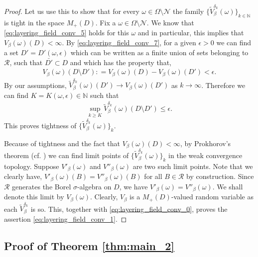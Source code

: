 \documentclass[a4paper, 11pt, reqno]{amsart}
\theoremstyle{definition} \newtheorem{defn}{Definition}[section]
\theoremstyle{remark} \newtheorem{rem}[defn]{Remark}
\theoremstyle{remark} \newtheorem*{rem*}{Remark}
\theoremstyle{plain} \newtheorem{thm}[defn]{Theorem}
\theoremstyle{plain} \newtheorem{lem}[defn]{Lemma}
\theoremstyle{plain} \newtheorem{prop}[defn]{Proposition}
\theoremstyle{plain} \newtheorem{cor}[defn]{Corollary}
\theoremstyle{remark} \newtheorem{exm}[defn]{\textbf{Example}}
\theoremstyle{remark} \newtheorem{exms}[defn]{\textbf{Examples}}
\theoremstyle{remark} \newtheorem*{bl}{}
\numberwithin{equation}{section} %
\newcommand{\mc}{\mathcal}
\newcommand{\N}{\mathbb{N}}
\begin{document}
\begin{proof}
		Let us use this to show that for every $\omega \in \Omega\setminus \mc{N}$ the family $\{\tilde{V}^{\delta_k}_{\beta}(\omega)\}_{k \in \N}$ is tight in the space $M_{+}(D)$. Fix a $\omega \in \Omega\setminus \mc{N}$. We know that \eqref{eq:layering_field_conv_5} holds for this $\omega$ and in particular, this implies that $V_{\beta}(\omega)(D)  < \infty$. By \eqref{eq:layering_field_conv_7}, for a given $\epsilon>0$ we can find a set $D' = D'(\omega, \epsilon)$ which can be written as a finite union of sets belonging to $\mc{R}$, such that $\bar{D'} \subset D$ and which has the property that,
		\begin{align}
			V_{\beta}(\omega) (D \setminus D') : = V_{\beta}(\omega)(D) - V_{\beta}(\omega)(D')< \epsilon.
		\end{align}
		By our assumptions, $\tilde{V}^{\delta_k}_{\beta}(\omega)(D') \to V_{\beta}(\omega)(D')$ as $k \to \infty$. Therefore we can find $K = K (\omega, \epsilon) \in \N$ such that 
		\begin{align}
			\sup_{k \ge K} \tilde{V}^{\delta_k}_{\beta}(\omega) (D\setminus D')  \le \epsilon.
		\end{align}
		This proves tightness of $\{\tilde{V}^{\delta_k}_{\beta}(\omega)\}_{k}$.
		
		Because of tightness and the fact that $V_{\beta}(\omega)(D) < \infty$, by Prokhorov's theorem (cf. \cite[Theorem 8.6.2]{bogachev07}) we can find limit points of $\{ \tilde{V}^{\delta_k}_{\beta}(\omega)\}_k$ in the weak convergence topology. Suppose $V'_{\beta}(\omega)$ and $V''_{\beta}(\omega)$ are two such limit points. Note that we clearly have, $V'_{\beta}(\omega)(B) = V''_{\beta}(\omega)(B)$ for all $B \in \mc{R} $ by construction. Since $\mc{R}$ generates the Borel $\sigma$-algebra on $D$, we have $V'_{\beta}(\omega) = V''_{\beta}(\omega)$. We shall denote this limit by $V_{\beta}(\omega)$. Clearly, $V_{\beta}$ is a $M_+(D)$-valued random variable as each $\tilde{V}^{\delta_k}_{\beta}$ is so. This, together with \eqref{eq:layering_field_conv_0}, proves the assertion \eqref{eq:layering_field_conv_1}. 	
	\end{proof}

    \subsection{Proof of Theorem \ref{thm:main_2}}\label{sec:GLF_exists}
\end{document}
